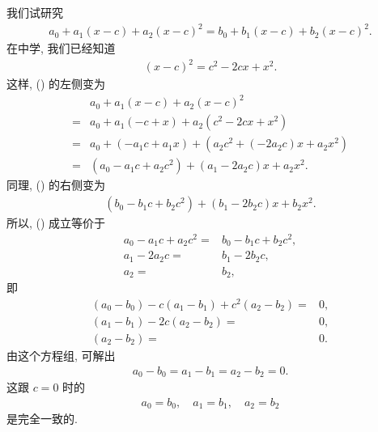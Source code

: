 \begin{example}
    我们试研究
    \begin{align*}
        a_0 + a_1 (x - c) + a_2 (x - c)^2 = b_0 + b_1 (x - c) + b_2 (x - c)^2 \tag*{(\myStar)}.
    \end{align*}
    在中学, 我们已经知道
    \begin{align*}
        (x - c)^2 = c^2 - 2cx + x^2.
    \end{align*}
    这样, (\myStar) 的左侧变为
    \begin{align*}
             & a_0 + a_1 (x - c) + a_2 (x - c)^2                          \\
        = {} & a_0 + a_1 (-c + x) + a_2 (c^2 - 2cx + x^2)                 \\
        = {} & a_0 + (-a_1 c + a_1 x) + (a_2 c^2 + (-2a_2 c) x + a_2 x^2) \\
        = {} & (a_0 - a_1 c + a_2 c^2) + (a_1 -2a_2 c) x + a_2 x^2.
    \end{align*}
    同理, (\myStar) 的右侧变为
    \begin{align*}
        (b_0 - b_1 c + b_2 c^2) + (b_1 -2b_2 c) x + b_2 x^2.
    \end{align*}
    所以, (\myStar) 成立等价于
    \begin{align*}
        a_0 - a_1 c + a_2 c^2 = {} & b_0 - b_1 c + b_2 c^2, \\
        a_1 -2a_2 c           = {} & b_1 -2b_2 c,           \\
        a_2                   = {} & b_2,
    \end{align*}
    即
    \begin{align*}
        (a_0 - b_0) - c(a_1 - b_1) + c^2(a_2 - b_2) = {} & 0, \\
        (a_1 - b_1) - 2c(a_2 - b_2)                 = {} & 0, \\
        (a_2 - b_2)                                 = {} & 0.
    \end{align*}
    由这个方程组, 可解出
    \begin{align*}
        a_0 - b_0 = a_1 - b_1 = a_2 - b_2 = 0.
    \end{align*}
    这跟 $c = 0$ 时的
    \begin{align*}
        a_0 = b_0, \quad a_1 = b_1, \quad a_2 = b_2
    \end{align*}
    是完全一致的.
\end{example}

